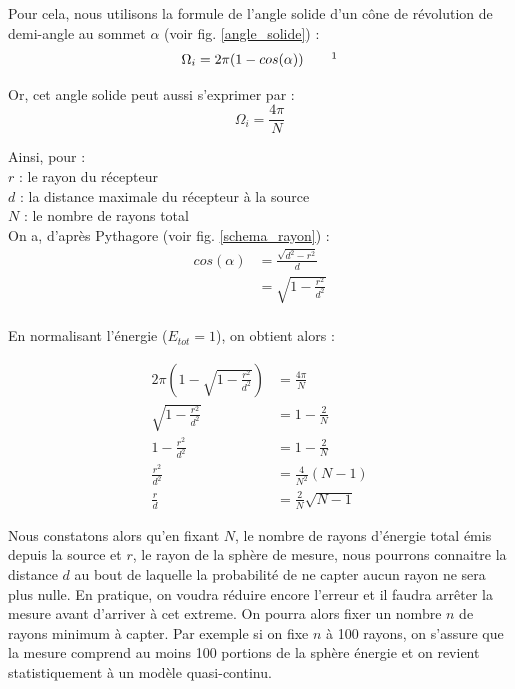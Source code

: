Pour cela, nous utilisons la formule de l'angle solide d'un cône de révolution de demi-angle au sommet $\alpha$ (voir fig. \ref{angle_solide}) :
\begin{equation}
	\Omega_i = 2\pi(1-cos(\alpha)) \qquad \footnotemark 
\end{equation}

Or, cet angle solide peut aussi s'exprimer par :
\begin{equation}
	\Omega_i = \frac{4\pi}{N}
\end{equation}


Ainsi, pour : \\
$r$ : le rayon du récepteur \\
$d$ : la distance maximale du récepteur à la source \\
$N$ : le nombre de rayons total \\

On a, d'après Pythagore (voir fig. \ref{schema_rayon}) :
\begin{align}
	cos(\alpha) & =  \frac{\sqrt{d^2-r^2}}{d}  \\
	& =  \sqrt{1-\frac{r^2}{d^2}} \\
\end{align}

En normalisant l'énergie ($E_{tot} = 1$), on obtient alors :

\begin{align} 
	2\pi(1-\sqrt{1-\frac{r^2}{d^2}}) &= \frac{4\pi}{N} \\	
	\sqrt{1-\frac{r^2}{d^2}} &= 1-\frac{2}{N} \\
	1-\frac{r^2}{d^2} &= 1-\frac{2}{N} \\
	\frac{r^2}{d^2} &= \frac{4}{N^2}(N-1) \\
	 \frac{r}{d} &=  \frac{2}{N} \sqrt{N-1} \label{seuil_arret}
\end{align}


Nous constatons alors qu'en fixant $N$, le nombre de rayons d'énergie total émis depuis la source et $r$, le rayon de la sphère de mesure, nous pourrons connaitre la distance $d$ au bout de laquelle la probabilité de ne capter aucun rayon ne sera plus nulle. En pratique, on voudra réduire encore l'erreur et il faudra arrêter la mesure avant d'arriver à cet extreme. On pourra alors fixer un nombre $n$ de rayons minimum à capter. Par exemple si on fixe $n$ à 100 rayons, on s'assure que la mesure comprend au moins 100 portions de la sphère énergie et on revient statistiquement à un modèle quasi-continu.

